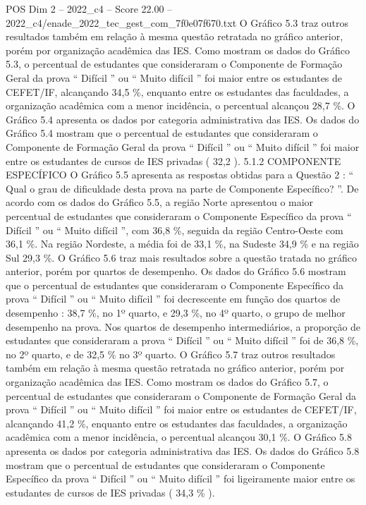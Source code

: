 \begin{textsample}{POS Dim 2 – 2022\_c4 – Score 22.00 – 2022\_c4/enade\_2022\_tec\_gest\_com\_7f0e07f670.txt}
O Gráfico 5.3 traz outros resultados também em relação à mesma questão retratada no gráfico anterior, porém por organização acadêmica das IES.
Como mostram os dados do Gráfico 5.3, o percentual de estudantes que consideraram o Componente de Formação Geral da prova “ Difícil ” ou “ Muito difícil ” foi maior entre os estudantes de CEFET/IF, alcançando 34,5 \%, enquanto entre os estudantes das faculdades, a organização acadêmica com a menor incidência, o percentual alcançou 28,7 \%.
O Gráfico 5.4 apresenta os dados por categoria administrativa das IES.
Os dados do Gráfico 5.4 mostram que o percentual de estudantes que consideraram o Componente de Formação Geral da prova “ Difícil ” ou “ Muito difícil ” foi maior entre os estudantes de cursos de IES privadas ( 32,2 ). 5.1.2 COMPONENTE ESPECÍFICO O Gráfico 5.5 apresenta as respostas obtidas para a Questão 2 : “ Qual o grau de dificuldade desta prova na parte de Componente Específico? ”.
De acordo com os dados do Gráfico 5.5, a região Norte apresentou o maior percentual de estudantes que consideraram o Componente Específico da prova “ Difícil ” ou “ Muito difícil ”, com 36,8 \%, seguida da região Centro-Oeste com 36,1 \%.
Na região Nordeste, a média foi de 33,1 \%, na Sudeste 34,9 \% e na região Sul 29,3 \%.
O Gráfico 5.6 traz mais resultados sobre a questão tratada no gráfico anterior, porém por quartos de desempenho.
Os dados do Gráfico 5.6 mostram que o percentual de estudantes que consideraram o Componente Específico da prova “ Difícil ” ou “ Muito difícil ” foi decrescente em função dos quartos de desempenho : 38,7 \%, no 1º quarto, e 29,3 \%, no 4º quarto, o grupo de melhor desempenho na prova.
Nos quartos de desempenho intermediários, a proporção de estudantes que consideraram a prova “ Difícil ” ou “ Muito difícil ” foi de 36,8 \%, no 2º quarto, e de 32,5 \% no 3º quarto.
O Gráfico 5.7 traz outros resultados também em relação à mesma questão retratada no gráfico anterior, porém por organização acadêmica das IES.
Como mostram os dados do Gráfico 5.7, o percentual de estudantes que consideraram o Componente de Formação Geral da prova “ Difícil ” ou “ Muito difícil ” foi maior entre os estudantes de CEFET/IF, alcançando 41,2 \%, enquanto entre os estudantes das faculdades, a organização acadêmica com a menor incidência, o percentual alcançou 30,1 \%.
O Gráfico 5.8 apresenta os dados por categoria administrativa das IES.
Os dados do Gráfico 5.8 mostram que o percentual de estudantes que consideraram o Componente Específico da prova “ Difícil ” ou “ Muito difícil ” foi ligeiramente maior entre os estudantes de cursos de IES privadas ( 34,3 \% ).

\end{textsample}
